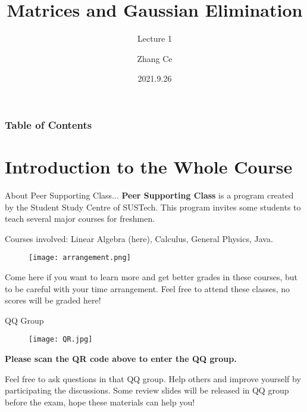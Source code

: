 \documentclass{beamer}
\title[Linear Algebra] %
{Matrices and Gaussian Elimination}
\subtitle{Lecture 1}
\author[11910803@mail.sustech.edu.cn] %
{
    Zhang Ce
}
\institute[] %
{
    Department of Electrical and Electronic Engineering\\
    Southern University of Science and Technology
}
\date[2021.9.26] %
{2021.9.26}
\begin{document}
\frame{\titlepage}


\begin{frame}
\frametitle{Table of Contents}
\tableofcontents
\end{frame}

\section{Introduction to the Whole Course}

\begin{frame}{About Peer Supporting Class...}
\textbf{Peer Supporting Class} is a program created by the Student Study Centre of SUSTech. This program invites some students to teach several major courses for freshmen.

Courses involved: Linear Algebra (here), Calculus, General Physics, Java.

\begin{figure}
    \centering
    \texttt{[image: arrangement.png]}
\end{figure}

Come here if you want to learn more and get better grades in these courses, but to be careful with your time arrangement. Feel free to attend these classes, no scores will be graded here!

\end{frame}

\begin{frame}{QQ Group}
\begin{figure}
    \centering
    \texttt{[image: QR.jpg]}
\end{figure}
\textbf{Please scan the QR code above to enter the QQ group.}

Feel free to ask questions in that QQ group. Help others and improve yourself by participating the discussions. Some review slides will be released in QQ group before the exam, hope these materials can help you!

\end{frame}
\end{document}

